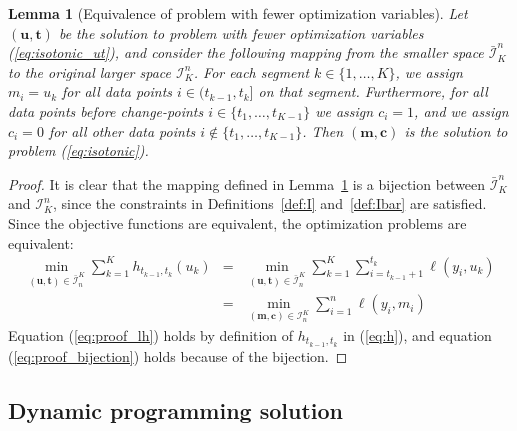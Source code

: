 \documentclass{article}
\newtheorem{lemma}{Lemma}
\begin{document}
\begin{lemma}[Equivalence of problem with fewer optimization variables]
  \label{lemma:fewer-variables}
  Let $(\mathbf u, \mathbf t)$ be the solution to problem with fewer
  optimization variables (\ref{eq:isotonic_ut}), and consider the
  following mapping from the smaller space $\bar{\mathcal I}_K^n$ to
  the original larger space $\mathcal I_K^n$. For each segment
  $k\in\{1,\dots,K\}$, we assign $m_i = u_k$ for all data points
  $i\in(t_{k-1},t_k]$ on that segment. Furthermore, for all data
  points before change-points $i\in\{t_1,\dots,t_{K-1}\}$ we assign
  $c_i=1$, and we assign $c_i=0$ for all other data points
  $i\not\in\{t_1,\dots,t_{K-1}\}$. Then $(\mathbf m, \mathbf c)$ is
  the solution to problem (\ref{eq:isotonic}).
\end{lemma}

\begin{proof}
  It is clear that the mapping defined in Lemma~\ref{lemma:fewer-variables} is
  a bijection between $\bar{\mathcal I}_K^n$ and $\mathcal I_K^n$,
  since the constraints in Definitions~\ref{def:I} and~\ref{def:Ibar}
  are satisfied. Since the objective functions are equivalent, the
  optimization problems are equivalent:
  \begin{eqnarray}
  \min_{(\mathbf u, \mathbf t)\in\bar{\mathcal I}_n^K}
  \sum_{k=1}^K
  h_{t_{k-1}, t_k}(u_k) 
    &=& \label{eq:proof_lh}
  \min_{(\mathbf u, \mathbf t)\in\bar{\mathcal I}_n^K}
\sum_{k=1}^K 
        \sum_{i=t_{k-1}+1}^{t_k} \ell(y_i, u_k)\\
    &=& \label{eq:proof_bijection}
  \min_{(\mathbf m, \mathbf c)\in\mathcal I_n^K}
        \sum_{i=1}^{n} \ell(y_i, m_i)
  \end{eqnarray}
  Equation (\ref{eq:proof_lh}) holds by definition of
  $h_{t_{k-1},t_k}$ in (\ref{eq:h}), and equation
  (\ref{eq:proof_bijection}) holds because of the bijection.
\end{proof}

\subsection{Dynamic programming solution}
\end{document}
